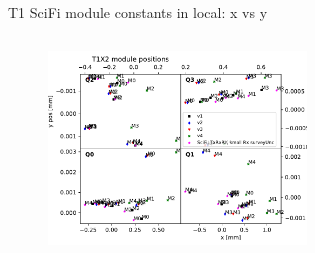 \documentclass[aspectratio=1610, 12pt]{beamer}
\begin{document}
\begin{frame}{T1 SciFi module constants in local: x vs y}
\begin{columns}
\begin{column}[c]{0.5\textwidth}
\begin{figure}
        \includegraphics[width=0.61\textwidth]{plots/out_x_y_pos/retest_x_vs_y_local_T1X2.pdf}
      \end{figure}
    \end{column}
  \end{columns}
\end{frame}
\end{document}
